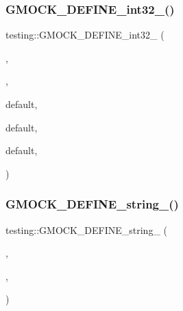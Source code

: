 \mbox{\label{namespacetesting_a211b4be008f5b4cccee486a262d91a52}} 
\subsubsection{\texorpdfstring{GMOCK\_DEFINE\_int32\_()}{GMOCK\_DEFINE\_int32\_()}}
{\footnotesize\ttfamily testing\+::\+G\+M\+O\+C\+K\+\_\+\+D\+E\+F\+I\+N\+E\+\_\+int32\+\_\+ (\begin{DoxyParamCaption}\item[{default\+\_\+mock\+\_\+behavior}]{,  }\item[{1}]{,  }\item[{\char`\"{}Controls the default behavior of mocks.\char`\"{} \char`\"{} Valid values\+:\textbackslash{}n\char`\"{} \char`\"{} 0 -\/ by}]{default,  }\item[{mocks act as Nice\+Mocks.\textbackslash{}n\char`\"{} \char`\"{} 1 -\/ by}]{default,  }\item[{mocks act as Naggy\+Mocks.\textbackslash{}n\char`\"{} \char`\"{} 2 -\/ by}]{default,  }\item[{mocks act as Strict\+Mocks.\char`\"{}}]{ }\end{DoxyParamCaption})}

\mbox{\label{namespacetesting_a92ea84a47432512152022ef73176676f}} 
\subsubsection{\texorpdfstring{GMOCK\_DEFINE\_string\_()}{GMOCK\_DEFINE\_string\_()}}
{\footnotesize\ttfamily testing\+::\+G\+M\+O\+C\+K\+\_\+\+D\+E\+F\+I\+N\+E\+\_\+string\+\_\+ (\begin{DoxyParamCaption}\item[{verbose}]{,  }\item[{\mbox{\hyperlink{namespacetesting_1_1internal_ad9386ccda6b6deac2f7b84784d3088c0}{internal\+::k\+Warning\+Verbosity}}}]{,  }\item[{\char`\"{}Controls how verbose Google \mbox{\hyperlink{classMock}{Mock}}\textquotesingle{}s output is.\char`\"{} \char`\"{} Valid values\+:\textbackslash{}n\char`\"{} \char`\"{} info -\/ prints all messages.\textbackslash{}n\char`\"{} \char`\"{} warning -\/ prints warnings and errors.\textbackslash{}n\char`\"{} \char`\"{} error -\/ prints errors only.\char`\"{}}]{ }\end{DoxyParamCaption})}

